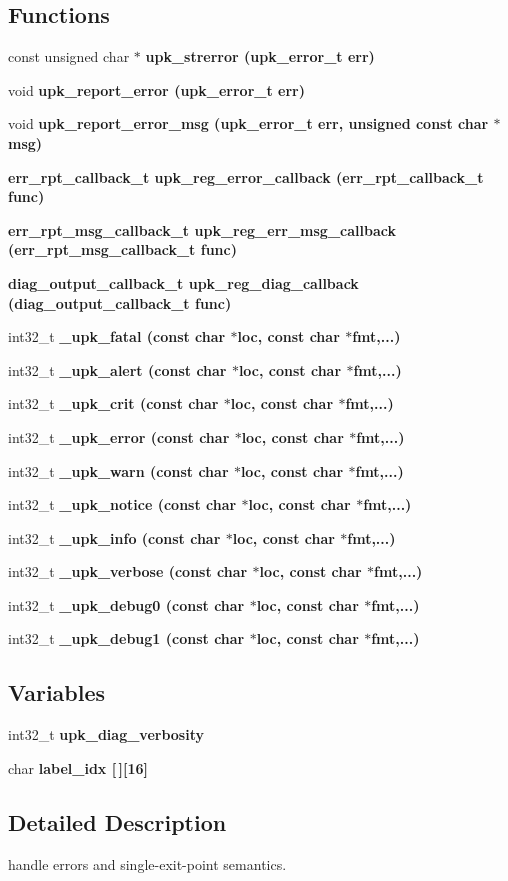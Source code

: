 \subsection*{Functions}
\begin{CompactItemize}
\item 
const unsigned char $\ast$ \bf{upk\_\-strerror} (\bf{upk\_\-error\_\-t} err)
\item 
void \bf{upk\_\-report\_\-error} (\bf{upk\_\-error\_\-t} err)
\item 
void \bf{upk\_\-report\_\-error\_\-msg} (\bf{upk\_\-error\_\-t} err, unsigned const char $\ast$msg)
\item 
\bf{err\_\-rpt\_\-callback\_\-t} \bf{upk\_\-reg\_\-error\_\-callback} (\bf{err\_\-rpt\_\-callback\_\-t} func)
\item 
\bf{err\_\-rpt\_\-msg\_\-callback\_\-t} \bf{upk\_\-reg\_\-err\_\-msg\_\-callback} (\bf{err\_\-rpt\_\-msg\_\-callback\_\-t} func)
\item 
\bf{diag\_\-output\_\-callback\_\-t} \bf{upk\_\-reg\_\-diag\_\-callback} (\bf{diag\_\-output\_\-callback\_\-t} func)
\item 
int32\_\-t \bf{\_\-upk\_\-fatal} (const char $\ast$loc, const char $\ast$fmt,...)
\item 
int32\_\-t \bf{\_\-upk\_\-alert} (const char $\ast$loc, const char $\ast$fmt,...)
\item 
int32\_\-t \bf{\_\-upk\_\-crit} (const char $\ast$loc, const char $\ast$fmt,...)
\item 
int32\_\-t \bf{\_\-upk\_\-error} (const char $\ast$loc, const char $\ast$fmt,...)
\item 
int32\_\-t \bf{\_\-upk\_\-warn} (const char $\ast$loc, const char $\ast$fmt,...)
\item 
int32\_\-t \bf{\_\-upk\_\-notice} (const char $\ast$loc, const char $\ast$fmt,...)
\item 
int32\_\-t \bf{\_\-upk\_\-info} (const char $\ast$loc, const char $\ast$fmt,...)
\item 
int32\_\-t \bf{\_\-upk\_\-verbose} (const char $\ast$loc, const char $\ast$fmt,...)
\item 
int32\_\-t \bf{\_\-upk\_\-debug0} (const char $\ast$loc, const char $\ast$fmt,...)
\item 
int32\_\-t \bf{\_\-upk\_\-debug1} (const char $\ast$loc, const char $\ast$fmt,...)
\end{CompactItemize}
\subsection*{Variables}
\begin{CompactItemize}
\item 
int32\_\-t \bf{upk\_\-diag\_\-verbosity}
\item 
char \bf{label\_\-idx} [$\,$][16]
\end{CompactItemize}


\subsection{Detailed Description}
handle errors and single-exit-point semantics. 

